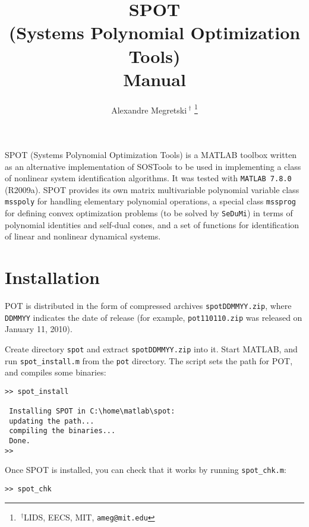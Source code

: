 \documentclass[12pt]{article}
\title{
SPOT\\ (Systems Polynomial Optimization Tools)\\ Manual
}
\author{Alexandre Megretski$\ ^\dagger$%
\thanks{$\ ^\dagger$LIDS, EECS, MIT,
        {\tt\small ameg@mit.edu}}%
}
\newcounter{example}
\begin{document}
\maketitle
\thispagestyle{empty}
\pagestyle{empty}


SPOT (Systems Polynomial Optimization Tools) 
is a MATLAB toolbox written as an alternative
implementation of SOSTools to be used in 
implementing a class of 
nonlinear system identification algorithms. 
It was tested with {\tt MATLAB 7.8.0}
(R2009a).
SPOT provides its own matrix multivariable polynomial variable
class {\tt msspoly} for handling elementary polynomial operations, 
a special class {\tt mssprog} for defining convex optimization problems
(to be solved by {\tt SeDuMi}) in terms 
of polynomial identities and self-dual cones, 
and a set of
functions for identification of linear and nonlinear dynamical systems.

\section{Installation}
POT is distributed in the form of 
compressed archives {\tt spotDDMMYY.zip},
where {\tt DDMMYY} indicates the date of release (for example,
{\tt pot110110.zip} was released on January 11, 2010).

Create directory {\tt spot} and extract {\tt spotDDMMYY.zip} into it. 
Start MATLAB, and run {\tt spot\_install.m} from the {\tt pot}
directory. The script sets the path for POT, and compiles some binaries:
\begin{verbatim}
>> spot_install

 Installing SPOT in C:\home\matlab\spot:
 updating the path...
 compiling the binaries...
 Done.
>> 
\end{verbatim}

Once SPOT is installed, you can check that it works by running
{\tt spot\_chk.m}:
\begin{verbatim}
>> spot_chk
\end{verbatim}
\end{document}
